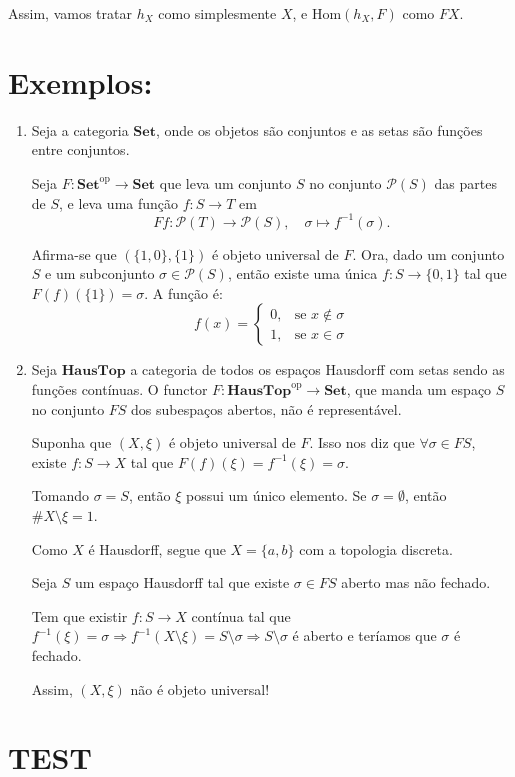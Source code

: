 \documentclass{article}
\theoremstyle{plain}                    %
\theoremstyle{definition}
\theoremstyle{remark}
\begin{document}
Assim, vamos tratar $h_X$ como simplesmente $X$, e $\text{Hom}(h_X, F)$ como $FX$.

\section*{Exemplos:}

\begin{enumerate}
    \item Seja a categoria \(\mathbf{Set}\), onde os objetos são conjuntos e as setas são funções entre conjuntos.

    Seja \(F: \mathbf{Set}^{\text{op}} \to \mathbf{Set}\) que leva um conjunto \(S\) no conjunto \(\mathcal{P}(S)\) das partes de \(S\), e leva uma função \(f: S \to T\) em 
    \[
    Ff: \mathcal{P}(T) \to \mathcal{P}(S), \quad \sigma \mapsto f^{-1}(\sigma).
    \]

    Afirma-se que \((\{1,0\}, \{1\})\) é objeto universal de \(F\). Ora, dado um conjunto \(S\) e um subconjunto \(\sigma \in \mathcal{P}(S)\), então existe uma única \(f: S \to \{0,1\}\) tal que \(F(f)(\{1\}) = \sigma\). A função é:
    \[
    f(x) = 
    \begin{cases}
    0, & \text{se } x \notin \sigma \\
    1, & \text{se } x \in \sigma
    \end{cases}
    \]

    \item Seja \(\mathbf{HausTop}\) a categoria de todos os espaços Hausdorff com setas sendo as funções contínuas. O functor \(F: \mathbf{HausTop}^{\text{op}} \to \mathbf{Set}\), que manda um espaço \(S\) no conjunto \(FS\) dos subespaços abertos, não é representável.

    Suponha que \((X, \xi)\) é objeto universal de \(F\). Isso nos diz que \(\forall \sigma \in FS\), existe \(f: S \to X\) tal que \(F(f)(\xi) = f^{-1}(\xi) = \sigma\).

    Tomando \(\sigma = S\), então \(\xi\) possui um único elemento. Se \(\sigma = \emptyset\), então \(\# X \setminus \xi = 1\).

    Como \(X\) é Hausdorff, segue que \(X = \{a, b\}\) com a topologia discreta.

    Seja \(S\) um espaço Hausdorff tal que existe \(\sigma \in FS\) aberto mas não fechado.

    Tem que existir \(f: S \to X\) contínua tal que \(f^{-1}(\xi) = \sigma \Rightarrow f^{-1}(X \setminus \xi) = S \setminus \sigma \Rightarrow S \setminus \sigma\) é aberto e teríamos que \(\sigma\) é fechado.

    \medskip

    Assim, \((X, \xi)\) não é objeto universal!
\end{enumerate}

\section{TEST}
\end{document}
